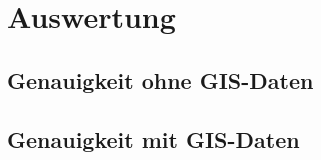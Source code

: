 \chapter{Auswertung}
\clearpage

\section{Genauigkeit ohne GIS-Daten}
\section{Genauigkeit mit GIS-Daten}
